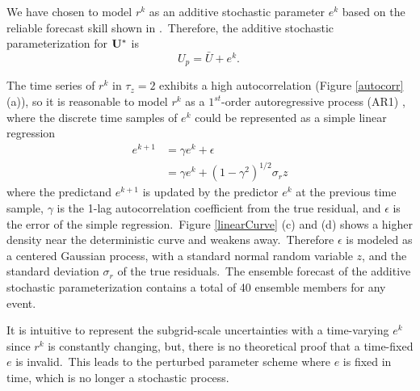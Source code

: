 		
		We have chosen to model $r^k$ as an additive stochastic parameter $e^k$
		based on the reliable forecast skill shown in \citet{Arnold13}.\
		Therefore, the additive stochastic parameterization for $\bold{U^*}$ is 
		\begin{equation} \label{stochParm}
			U_p = \bar{U} + e^k.\
		\end{equation}

		
		The time series of $r^k$ in $\tau_z=2$ exhibits a high autocorrelation (Figure {\ref{autocorr}} (a)), 
		so it is reasonable to model $r^k$ as a $1^{st}$-order autoregressive process 
		(AR1) {\citep{Wilks11}}, where the discrete time samples of $e^k$ could be represented
		as a simple linear regression
		\begin{equation} \label{AR1}
			\begin{aligned}
			e^{k+1}
			& = \gamma e^k + \epsilon  \\
			& = \gamma e^k + (1-\gamma^2)^{1/2} \sigma_r z
			\end{aligned}
		\end{equation}
		where the predictand $e^{k+1}$ is updated by the predictor $e^k$ at the previous time sample,
		$\gamma$ is the 1-lag autocorrelation coefficient from the true residual, 
		and $\epsilon$ is the error of the simple regression.\
		Figure {\ref{linearCurve}} (c) and (d) shows a higher
		density near the deterministic curve and weakens away.\
		Therefore $\epsilon$ is modeled as a
		centered Gaussian process, 
		with a standard normal random variable $z$,
		and the standard deviation $\sigma_r$ of the true residuals.\
		The ensemble forecast of the additive stochastic parameterization 
		contains a total of 40 ensemble members for any event.\

		
		It is intuitive to represent the subgrid-scale 
		uncertainties with a time-varying $e^k$ since $r^k$ is constantly changing,
		but, there is no theoretical proof that a time-fixed $e$ is invalid.\
		This leads to the perturbed parameter scheme where 
		$e$ is fixed in time, which is no longer a stochastic process.\

		
